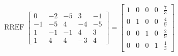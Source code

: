 \begin{exerciseAnswer} 


\[\operatorname{RREF} \left[\begin{array}{ccccc}
0 & -2 & -5 & 3 & -1 \\
-1 & -5 & 4 & -4 & -5 \\
1 & -1 & -1 & 4 & 3 \\
1 & 4 & 4 & -3 & 4
\end{array}\right] = \left[\begin{array}{ccccc}
1 & 0 & 0 & 0 & \frac{7}{3} \\
0 & 1 & 0 & 0 & \frac{4}{9} \\
0 & 0 & 1 & 0 & \frac{2}{9} \\
0 & 0 & 0 & 1 & \frac{1}{3}
\end{array}\right] \]



\end{exerciseAnswer}

